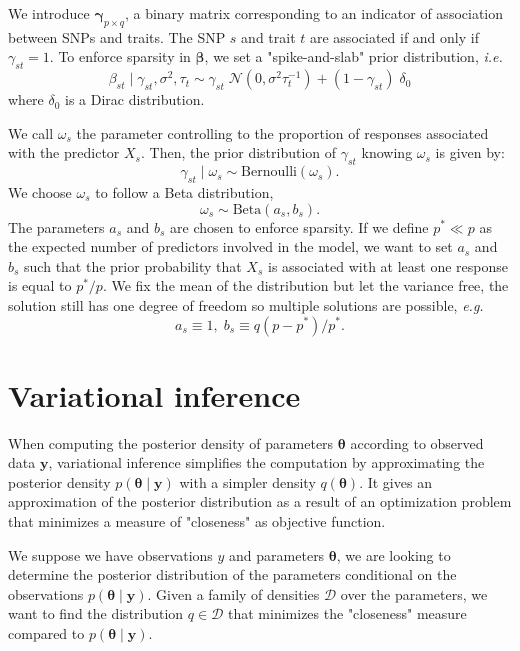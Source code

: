 \documentclass{article}
\numberwithin{equation}{section}
\begin{document}
We introduce $\boldsymbol{\gamma}_{p\times q}$, a binary matrix corresponding to an indicator of association between SNPs and traits. The SNP $s$ and trait $t$ are associated if and only if $\gamma_{st} = 1$. To enforce sparsity in $\boldsymbol{\beta}$, we set a "spike-and-slab" prior distribution, \textit{i.e.} 
\begin{equation*}
\beta_{st} \mid \gamma_{st},\sigma^2, \tau_t \sim \gamma_{st}\;\mathcal{N}(0,\sigma^2\tau_t^{-1})+(1-\gamma_{st})\;\delta_0
\end{equation*}
where $\delta_0$ is a Dirac distribution.

We call $\omega_s$ the parameter controlling to the proportion of responses associated with the predictor $X_s$. Then, the prior distribution of $\gamma_{st}$ knowing $\omega_s$ is given by:
\begin{equation*}
\gamma_{st} \mid \omega_s \sim  \text{Bernoulli}(\omega_s).
\end{equation*}
We choose $\omega_s$ to follow a Beta distribution,
\begin{equation*}
\omega_s \sim \text{Beta}(a_s, b_s).
\end{equation*}
The parameters $a_s$ and $b_s$ are chosen to enforce sparsity. If we define $p^* \ll p$ as the expected number of predictors involved in the model, we want to set $a_s$ and $b_s$ such that the prior probability that $X_s$ is associated with at least one response is equal to $p^*/p$. We fix the mean of the distribution but let the variance free, the solution still has one degree of freedom so multiple solutions are possible, \textit{e.g.}
\begin{equation*}
a_s \equiv 1,\;b_s \equiv q(p-p^*)/p^*.
\end{equation*}
\newpage
\section{Variational inference}
When computing the posterior density of parameters $\boldsymbol{\theta}$ according to observed data $\boldsymbol{y}$, variational inference simplifies the computation by approximating the posterior density $p(\boldsymbol{\theta}\mid \boldsymbol{y})$ with a simpler density $q(\boldsymbol{\theta})$. It gives an approximation of the posterior distribution as a result of an optimization problem that minimizes a measure of "closeness" as objective function.

We suppose we have observations $y$ and parameters $\boldsymbol{\theta}$, we are looking to determine the posterior distribution of the parameters conditional on the observations $p(\boldsymbol{\theta} \mid \boldsymbol{y})$. Given a family of densities $\mathcal{D}$ over the parameters, we want to find the distribution $q \in \mathcal{D}$ that minimizes the "closeness" measure compared to $p(\boldsymbol{\theta} \mid \boldsymbol{y})$.
\end{document}
